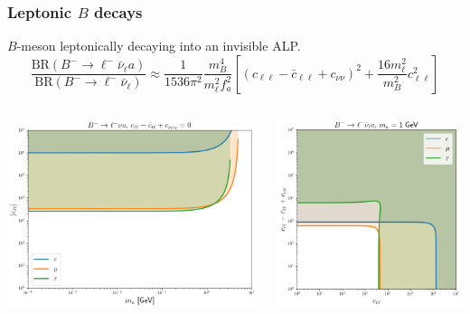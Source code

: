 \documentclass[mathserif, 10pt, aspectratio=169]{beamer}
\begin{document}
\begin{frame}\frametitle{Leptonic $B$ decays}

    $B$-meson leptonically decaying into an invisible ALP.
    $$\frac{\mathrm{BR}(B^-\to \ell^- \bar{\nu}_\ell a)}{\mathrm{BR}(B^-\to \ell^- \bar{\nu}_\ell)} \approx \frac{1}{1536\pi^2}\frac{m_B^4}{m_\ell^2 f_a^2}\left[(c_{\ell\ell}-\bar{c}_{\ell\ell}+c_{\nu\nu})^2+\frac{16 m_\ell^2}{m_B^2} c_{\ell\ell}^2\right]$$

    \begin{columns}
        \begin{column}{0.55\textwidth}
            \includegraphics[width=\columnwidth]{figures/limcl.png}
        \end{column}
        \begin{column}{0.4\textwidth}
            \includegraphics[width=\columnwidth]{figures/lim_c_1GeV.png}
        \end{column}
    \end{columns}
\end{frame}
\end{document}
